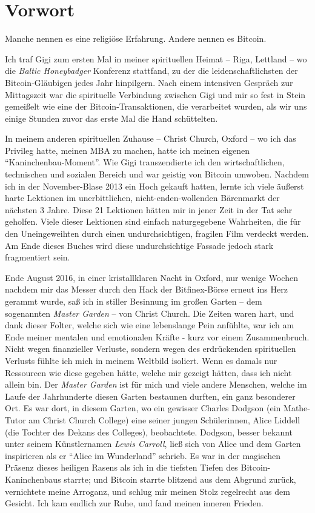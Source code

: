 \chapter*{Vorwort}

Manche nennen es eine religiöse Erfahrung. Andere nennen es Bitcoin.

Ich traf Gigi zum ersten Mal in meiner spirituellen Heimat -- Riga, Lettland --
wo die \textit{Baltic Honeybadger} Konferenz stattfand, zu der die
leidenschaftlichsten der Bitcoin-Gläubigen jedes Jahr hinpilgern. Nach einem
intensiven Gespräch zur Mittagszeit war die spirituelle Verbindung zwischen Gigi
und mir so fest in Stein gemeißelt wie eine der Bitcoin-Transaktionen, die
verarbeitet wurden, als wir uns einige Stunden zuvor das erste Mal die Hand
schüttelten.

In meinem anderen spirituellen Zuhause -- Christ Church, Oxford -- wo ich das
Privileg hatte, meinen MBA zu machen, hatte ich meinen eigenen
\enquote{Kaninchenbau-Moment}. Wie Gigi transzendierte ich den wirtschaftlichen,
technischen und sozialen Bereich und war geistig von Bitcoin umwoben. Nachdem
ich in der November-Blase 2013 ein Hoch gekauft hatten, lernte ich viele äußerst
harte Lektionen im unerbittlichen, nicht-enden-wollenden Bärenmarkt der nächsten
3 Jahre. Diese 21 Lektionen hätten mir in jener Zeit in der Tat sehr geholfen.
Viele dieser Lektionen sind einfach naturgegebene Wahrheiten, die für den
Uneingeweihten durch einen undurchsichtigen, fragilen Film verdeckt werden. Am
Ende dieses Buches wird diese undurchsichtige Fassade jedoch stark fragmentiert
sein.

Ende August 2016, in einer kristallklaren Nacht in Oxford, nur wenige Wochen
nachdem mir das Messer durch den Hack der Bitfinex-Börse erneut ins Herz
gerammt wurde, saß ich in stiller Besinnung im großen Garten -- dem
sogenannten \textit{Master Garden} -- von Christ Church. Die Zeiten waren hart,
und dank dieser Folter, welche sich wie eine lebenslange Pein anfühlte, war ich
am Ende meiner mentalen und emotionalen Kräfte - kurz vor einem Zusammenbruch.
Nicht wegen finanzieller Verluste, sondern wegen des erdrückenden spirituellen
Verlusts fühlte ich mich in meinem Weltbild isoliert. Wenn es damals nur
Ressourcen wie diese gegeben hätte, welche mir gezeigt hätten, dass ich nicht
allein bin. Der \textit{Master Garden} ist für mich und viele andere Menschen,
welche im Laufe der Jahrhunderte diesen Garten bestaunen durften, ein ganz
besonderer Ort. Es war dort, in diesem Garten, wo ein gewisser Charles Dodgson
(ein Mathe-Tutor am Christ Church College) eine seiner jungen Schülerinnen,
Alice Liddell (die Tochter des Dekans des Colleges), beobachtete. Dodgson,
besser bekannt unter seinem Künstlernamen \textit{Lewis Carroll}, ließ sich von
Alice und dem Garten inspirieren als er \enquote{Alice im Wunderland} schrieb.
Es war in der magischen Präsenz dieses heiligen Rasens als ich in die tiefsten
Tiefen des Bitcoin-Kaninchenbaus starrte; und Bitcoin starrte blitzend aus dem
Abgrund zurück, vernichtete meine Arroganz, und schlug mir meinen Stolz
regelrecht aus dem Gesicht. Ich kam endlich zur Ruhe, und fand meinen inneren
Frieden.

